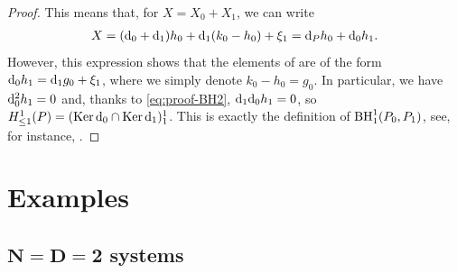\documentclass[10pt,a4paper]{amsart}
\numberwithin{equation}{section}
\begin{document}
\begin{proof}
This means that, for $X=X_0+X_1$, we can write
\begin{gather*}
X=({\rm d}_0+{\rm d}_1)h_0+{\rm d}_1(k_0-h_0)+\xi_1={\rm d}_P h_0 + {\rm d}_0h_1.
\end{gather*}
However, this expression shows that the elements of  are of the form ${\rm d}_0h_1={\rm d}_1 g_0+\xi_1$, where we simply denote $k_0-h_0=g_0$. In particular, we have ${\rm d}_0^2h_1=0$ and, thanks to \eqref{eq:proof-BH2}, ${\rm d}_1{\rm d}_0h_1=0$, so $H^1_{\leq 1}(P)= (\operatorname{Ker} {\rm d}_0\cap\operatorname{Ker} {\rm d}_1 )^1_{1}$. This is exactly the definition of ${\rm BH}^1_{1}(P_0,P_1)$, see, for instance, \cite{dubrovin2001normal,lz05}.
\end{proof}


\section{Examples}
\subsection[N=D=2 systems]{$\boldsymbol{N=D=2}$ systems}
\end{document}
